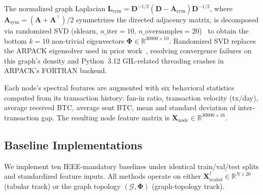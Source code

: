 \documentclass[journal]{IEEEtran}
\begin{document}
The normalized graph Laplacian
$\mathbf{L}_{\text{sym}} = \mathbf{D}^{-1/2}(\mathbf{D} - \mathbf{A}_{\text{sym}})\mathbf{D}^{-1/2}$,
where $\mathbf{A}_{\text{sym}} = (\mathbf{A} + \mathbf{A}^\top)/2$
symmetrizes the directed adjacency matrix, is decomposed via randomized SVD
(sklearn, $n\_\text{iter}=10$, $n\_\text{oversamples}=20$)~\cite{Halko2011}
to obtain the bottom $k = 10$ non-trivial eigenvectors
$\boldsymbol{\Phi} \in \mathbb{R}^{30000 \times 10}$.
Randomized SVD replaces the ARPACK eigensolver used in prior
work~\cite{Kipf2017}, resolving convergence failures on this graph's
density and Python~3.12 GIL-related threading crashes in ARPACK's
FORTRAN backend.

Each node's spectral features are augmented with six behavioral statistics
computed from its transaction history:
fan-in ratio, transaction velocity (tx/day), average received BTC,
average sent BTC, mean and standard deviation of inter-transaction gap.
The resulting node feature matrix is
$\mathbf{X}_{\text{node}} \in \mathbb{R}^{30000 \times 16}$.


\subsection{Baseline Implementations}
\label{subsec:baselines}

We implement ten IEEE-mandatory baselines under identical train/val/test splits
and standardized feature inputs.
All methods operate on either $\mathbf{X}^{\dagger}_{\text{scaled}} \in
\mathbb{R}^{N \times 20}$ (tabular track) or the graph topology
$(\mathcal{G}, \boldsymbol{\Phi})$ (graph-topology track).
\end{document}
